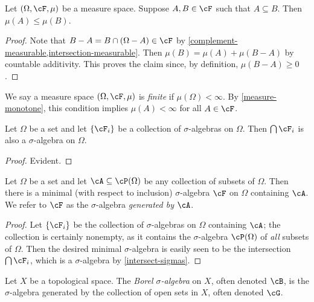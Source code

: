 \begin{lemma}
  \label{measure-monotone}
  Let $(\Omega, \cF, \mu)$ be a measure space. Suppose $A,B \in \cF$ such that $A \subseteq B$. Then $\mu(A) \le \mu(B)$.
\end{lemma}

\begin{proof}
  Note that $B-A = B \cap (\Omega-A) \in \cF$ by \cref{complement-measurable,intersection-measurable}. Then $\mu(B) = \mu(A) + \mu(B-A)$ by countable additivity. This proves the claim since, by definition, $\mu(B-A) \ge 0$.
\end{proof}

\begin{definition}
  \label{finite-measure}
  We say a measure space $(\Omega,\cF,\mu)$ is \emph{finite} if $\mu(\Omega) < \infty$. By \cref{measure-monotone}, this condition implies $\mu(A) < \infty$ for all $A \in \cF$.
\end{definition}

\begin{lemma}
  \label{intersect-sigmas}
  Let $\Omega$ be a set and let $\{\cF_i\}$ be a collection of $\sigma$-algebras on $\Omega$. Then $\bigcap \cF_i$ is also a $\sigma$-algebra on $\Omega$.
\end{lemma}

\begin{proof}
  Evident.
\end{proof}

\begin{lemma}
  \label{smallest-sigma}
  Let $\Omega$ be a set and let $\cA \subseteq \cP(\Omega)$ be any collection of subsets of $\Omega$. Then there is a minimal (with respect to inclusion) $\sigma$-algebra $\cF$ on $\Omega$ containing $\cA$. We refer to $\cF$ as the $\sigma$-algebra \emph{generated by} $\cA$.
\end{lemma}

\begin{proof}
  Let $\{\cF_i\}$ be the collection of $\sigma$-algebras on $\Omega$ containing $\cA$; the collection is certainly nonempty, as it contains the $\sigma$-algebra $\cP(\Omega)$ of \emph{all} subsets of $\Omega$. Then the desired minimal $\sigma$-algebra is easily seen to be the intersection  $\bigcap \cF_i$, which is a $\sigma$-algebra by \cref{intersect-sigmas}.
\end{proof}

\begin{definition}
  Let $X$ be a topological space. The \emph{Borel $\sigma$-algebra} on $X$, often denoted $\cB$, is the $\sigma$-algebra generated by the collection of open sets in $X$, often denoted $\cG$.
\end{definition}


% 
% 


